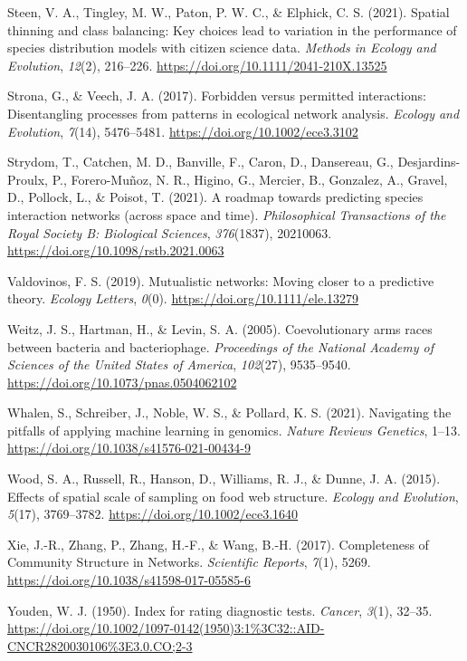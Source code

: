 \documentclass[11pt]{article}
\newlength{\cslhangindent}
\newenvironment{CSLReferences}[2] %
 {%
  \setlength{\parindent}{0pt}
  \ifodd #1 \everypar{\setlength{\hangindent}{\cslhangindent}}\ignorespaces\fi
  \ifnum #2 > 0
  \setlength{\parskip}{#2\baselineskip}
  \fi
 }%
 {}
\begin{document}
\begin{CSLReferences}{1}{0}
\leavevmode{}%
Steen, V. A., Tingley, M. W., Paton, P. W. C., \& Elphick, C. S. (2021).
Spatial thinning and class balancing: Key choices lead to variation in
the performance of species distribution models with citizen science
data. \emph{Methods in Ecology and Evolution}, \emph{12}(2), 216--226.
\url{https://doi.org/10.1111/2041-210X.13525}

\leavevmode{}%
Strona, G., \& Veech, J. A. (2017). Forbidden versus permitted
interactions: Disentangling processes from patterns in ecological
network analysis. \emph{Ecology and Evolution}, \emph{7}(14),
5476--5481. \url{https://doi.org/10.1002/ece3.3102}

\leavevmode{}%
Strydom, T., Catchen, M. D., Banville, F., Caron, D., Dansereau, G.,
Desjardins-Proulx, P., Forero-Muñoz, N. R., Higino, G., Mercier, B.,
Gonzalez, A., Gravel, D., Pollock, L., \& Poisot, T. (2021). A roadmap
towards predicting species interaction networks (across space and time).
\emph{Philosophical Transactions of the Royal Society B: Biological
Sciences}, \emph{376}(1837), 20210063.
\url{https://doi.org/10.1098/rstb.2021.0063}

\leavevmode{}%
Valdovinos, F. S. (2019). Mutualistic networks: Moving closer to a
predictive theory. \emph{Ecology Letters}, \emph{0}(0).
\url{https://doi.org/10.1111/ele.13279}

\leavevmode{}%
Weitz, J. S., Hartman, H., \& Levin, S. A. (2005). Coevolutionary arms
races between bacteria and bacteriophage. \emph{Proceedings of the
National Academy of Sciences of the United States of America},
\emph{102}(27), 9535--9540.
\url{https://doi.org/10.1073/pnas.0504062102}

\leavevmode{}%
Whalen, S., Schreiber, J., Noble, W. S., \& Pollard, K. S. (2021).
Navigating the pitfalls of applying machine learning in genomics.
\emph{Nature Reviews Genetics}, 1--13.
\url{https://doi.org/10.1038/s41576-021-00434-9}

\leavevmode{}%
Wood, S. A., Russell, R., Hanson, D., Williams, R. J., \& Dunne, J. A.
(2015). Effects of spatial scale of sampling on food web structure.
\emph{Ecology and Evolution}, \emph{5}(17), 3769--3782.
\url{https://doi.org/10.1002/ece3.1640}

\leavevmode{}%
Xie, J.-R., Zhang, P., Zhang, H.-F., \& Wang, B.-H. (2017). Completeness
of Community Structure in Networks. \emph{Scientific Reports},
\emph{7}(1), 5269. \url{https://doi.org/10.1038/s41598-017-05585-6}

\leavevmode{}%
Youden, W. J. (1950). Index for rating diagnostic tests. \emph{Cancer},
\emph{3}(1), 32--35.
\url{https://doi.org/10.1002/1097-0142(1950)3:1\%3C32::AID-CNCR2820030106\%3E3.0.CO;2-3}

\end{CSLReferences}
\end{document}
